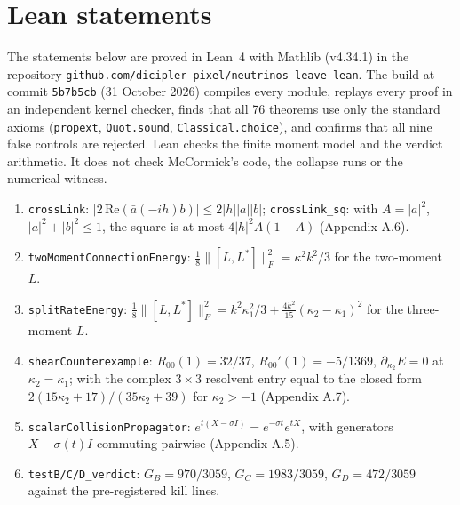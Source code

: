 \documentclass[11pt]{article}
\begin{document}
\section{Lean statements}
The statements below are proved in Lean~4 with Mathlib (v4.34.1) in the repository \texttt{github.com/dicipler-pixel/neutrinos-leave-lean}. The build at commit \texttt{5b7b5cb} (31 October 2026) compiles every module, replays every proof in an independent kernel checker, finds that all 76 theorems use only the standard axioms (\texttt{propext}, \texttt{Quot.sound}, \texttt{Classical.choice}), and confirms that all nine false controls are rejected. Lean checks the finite moment model and the verdict arithmetic. It does not check McCormick's code, the collapse runs or the numerical witness.
\begin{enumerate}
\item \texttt{crossLink}: $|2\,\mathrm{Re}(\bar a(-ih)b)|\le2|h||a||b|$; \texttt{crossLink\_sq}: with $A=|a|^2$, $|a|^2+|b|^2\le1$, the square is at most $4|h|^2A(1-A)$ (Appendix A.6).
\item \texttt{twoMomentConnectionEnergy}: $\tfrac18\lVert[L,L^\ast]\rVert_F^2=\kappa^2k^2/3$ for the two-moment $L$.
\item \texttt{splitRateEnergy}: $\tfrac18\lVert[L,L^\ast]\rVert_F^2=k^2\kappa_1^2/3+\tfrac{4k^2}{15}(\kappa_2-\kappa_1)^2$ for the three-moment $L$.
\item \texttt{shearCounterexample}: $R_{00}(1)=32/37$, $R_{00}'(1)=-5/1369$, $\partial_{\kappa_2}E=0$ at $\kappa_2=\kappa_1$; with the complex $3\times3$ resolvent entry equal to the closed form $2(15\kappa_2+17)/(35\kappa_2+39)$ for $\kappa_2>-1$ (Appendix A.7).
\item \texttt{scalarCollisionPropagator}: $e^{t(X-\sigma I)}=e^{-\sigma t}e^{tX}$, with generators $X-\sigma(t)I$ commuting pairwise (Appendix A.5).
\item \texttt{testB/C/D\_verdict}: $G_B=970/3059$, $G_C=1983/3059$, $G_D=472/3059$ against the pre-registered kill lines.
\end{enumerate}
\end{document}
